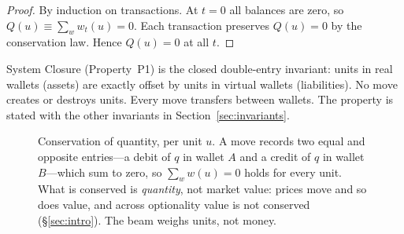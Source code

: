 \begin{proof}
By induction on transactions. At $t=0$ all balances are zero, so $Q(u) \equiv \sum_{w} w_t(u) = 0$. Each transaction preserves $Q(u) = 0$ by the conservation law. Hence $Q(u) = 0$ at all $t$.
\end{proof}

System Closure (Property~P1) is the closed double-entry invariant: units in real wallets (assets) are exactly offset by units in virtual wallets (liabilities). No move creates or destroys units. Every move transfers between wallets. The property is stated with the other invariants in Section~\ref{sec:invariants}.

\begin{figure}[tb]
\centering
{}
\caption{Conservation of quantity, per unit $u$. A move records two equal and opposite
entries---a debit of $q$ in wallet $A$ and a credit of $q$ in wallet $B$---which sum to
zero, so $\sum_{w} w(u) = 0$ holds for every unit. What is conserved is \emph{quantity},
not market value: prices move and so does value, and across optionality value is not
conserved (\S\ref{sec:intro}). The beam weighs units, not money.}
\label{fig:conservation}
\end{figure}

